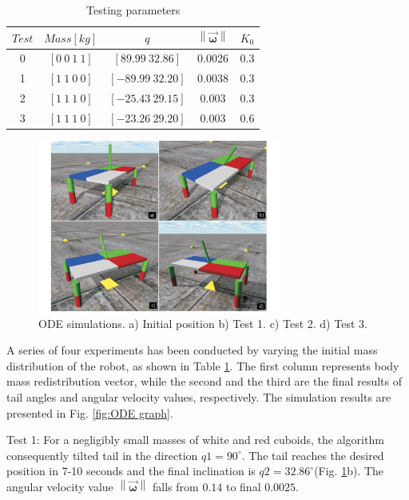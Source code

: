 \begin{table}[!t]
	\centering
\begin{tabular}{|c|c|c|c|c|}
	\hline
$Test$ &  $Mass[kg]$ & $q$  & $\left \| \vec{\boldsymbol{\omega}} \right \|$ & $K_0$\\
	\hline
0   & $[0\: 0\: 1\: 1]$ & $[89.99\: 32.86]$ & 0.0026 & 0.3\\
1   & $[1\: 1\: 0\: 0]$ & $[-89.99\: 32.20]$ & 0.0038 & 0.3\\
2   & $[1\: 1\: 1\: 0]$ & $[-25.43\: 29.15]$ &  0.003 & 0.3\\
3   & $[1\: 1\: 1\: 0]$ & $[-23.26\: 29.20]$ &  0.003 & 0.6\\
\hline
\end{tabular}
\caption{Testing parameters}\label{tab:Simulations}
\end{table}



\begin{figure}[!t]
	\centering
	\includegraphics[width=80mm]{./pictures/ODE_simulations.pdf}
	\caption{ODE simulations. a) Initial position b) Test 1. c) Test 2. d) Test 3.}
	\label{fig:ODESimulations}
\end{figure}

A series of four experiments has been conducted by varying the initial mass distribution of the robot, as shown in Table \ref{tab:Simulations}. The first column represents body mass redistribution vector, while the second and the third are the final results of tail angles and angular velocity values, respectively. The simulation results are presented in Fig. \ref{fig:ODE graph}. 

Test 1: For a negligibly small masses of white and red cuboids, the algorithm consequently tilted tail in the direction $q1=90^{\circ}$. The tail reaches the desired position in 7-10 seconds and the final inclination is $q2=32.86^{\circ}$(Fig. \ref{fig:ODESimulations}b). The angular velocity value $\left \| \vec{\boldsymbol{\omega}} \right \|$ falls from $0.14$ to final $0.0025$.

